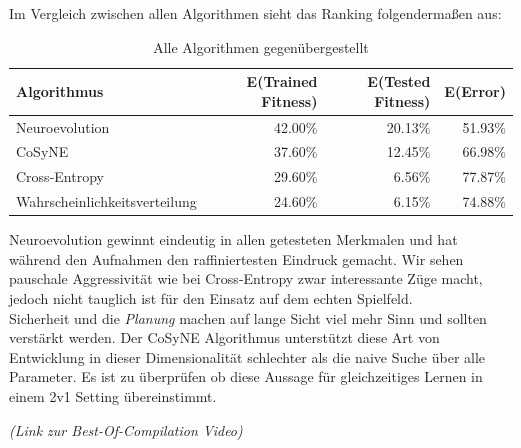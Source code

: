              Im Vergleich zwischen allen Algorithmen sieht das Ranking folgendermaßen aus:

                \begin{table}[H]
                    \begin{center}
                    \begin{tabular}{ |l|r|r|r| } 
                        \hline
                        \textbf{Algorithmus}          & E(Trained Fitness) & E(Tested Fitness) & E(Error)    \\ \hline
                        Neuroevolution                &          42.00\%   &         20.13\%   &    51.93\%  \\ \hline
                        CoSyNE                        &          37.60\%   &         12.45\%   &    66.98\%  \\ \hline
                        Cross-Entropy                 &          29.60\%   &          6.56\%   &    77.87\%  \\ \hline
                        Wahrscheinlichkeitsverteilung &          24.60\%   &          6.15\%   &    74.88\%  \\ \hline
                    \end{tabular}
                    \end{center}
                    \caption{Alle Algorithmen gegenübergestellt \label{fig:vergleichstabelle}}
                \end{table}

            \noindent
            Neuroevolution gewinnt eindeutig in allen getesteten Merkmalen und hat während den Aufnahmen den raffiniertesten Eindruck gemacht. Wir sehen pauschale Aggressivität wie bei Cross-Entropy zwar interessante Züge macht, jedoch nicht tauglich ist für den Einsatz auf dem echten Spielfeld. \\[2mm]

            \noindent
            Sicherheit und die \textit{Planung} machen auf lange Sicht viel mehr Sinn und sollten verstärkt werden. Der CoSyNE Algorithmus unterstützt diese Art von Entwicklung in dieser Dimensionalität schlechter als die naive Suche über alle Parameter. Es ist zu überprüfen ob diese Aussage für gleichzeitiges Lernen in einem 2v1 Setting übereinstimmt.\\[2mm]

            \begin{center} \textit{(Link zur Best-Of-Compilation Video)} \end{center}





